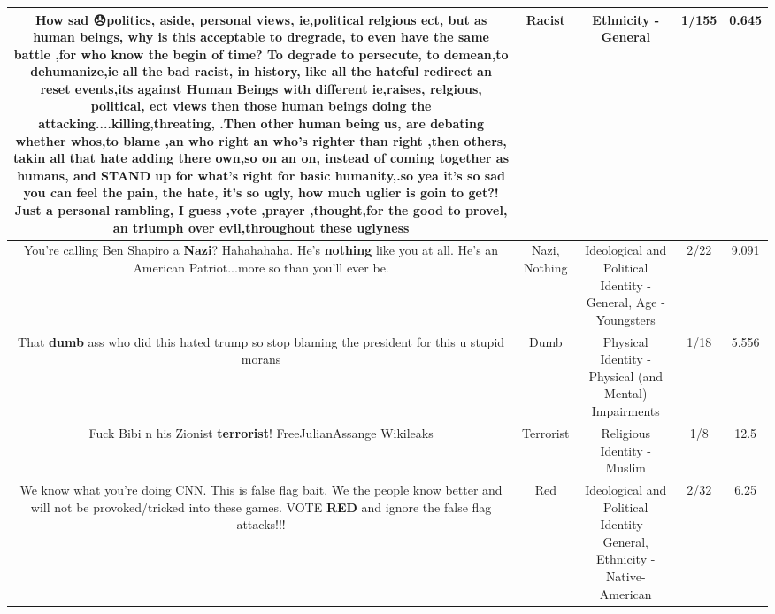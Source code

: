 \documentclass[11pt]{article}
\newlength\mylength
\begin{document}
\begin{center}
\begin{longtable}{|C{.65\mylength}|C{.30\mylength}|C{.12\mylength}|C{.12\mylength}|C{.12\mylength}|}
  \small How sad 😞politics, aside, personal views, ie,political relgious  ect, but as human beings, why is this acceptable to dregrade, to even have the same battle ,for who know the begin of time? To degrade to persecute, to demean,to dehumanize,ie all the bad \textbf{racist}, in history, like all the hateful redirect an reset events,its against Human Beings with different ie,raises, relgious, political, ect views then those human beings doing the attacking....killing,threating, .Then other human being us, are debating whether whos,to blame ,an who right an who's righter than right ,then others, takin all that hate adding there own,so on an on, instead of coming together as humans, and STAND up for what's right for basic  humanity,.so yea it's so sad you can feel the pain, the hate, it's so ugly, how much uglier is goin to get?! Just a personal rambling, I guess ,vote ,prayer ,thought,for the good to provel, an triumph over evil,throughout these uglyness\normalsize   & Racist & Ethnicity - General & 1/155 & 0.645 \\  \hline
  \small You're calling Ben Shapiro a \textbf{Nazi}? Hahahahaha. He's \textbf{nothing} like you at all. He's an American Patriot...more so than you'll ever be.\normalsize   & Nazi, Nothing &  Ideological and Political Identity - General, Age - Youngsters & 2/22 & 9.091 \\  \hline
  \small That \textbf{dumb} ass who did this hated trump so stop blaming the president for this u stupid morans\normalsize   & Dumb & Physical Identity - Physical (and Mental) Impairments & 1/18 & 5.556 \\  \hline
  \small Fuck Bibi n his Zionist \textbf{terrorist}! FreeJulianAssange Wikileaks\normalsize   & Terrorist & Religious Identity - Muslim & 1/8 & 12.5 \\  \hline
  \small We know what you're doing CNN. This is false flag bait. We the people know better and will not be provoked/tricked into these games. VOTE \textbf{R\textbf{ED}} and ignore the false flag attacks!!!\normalsize   & Red &  Ideological and Political Identity - General, Ethnicity - Native-American & 2/32 & 6.25 \\  \hline

\end{longtable}
\end{center}
\end{document}
